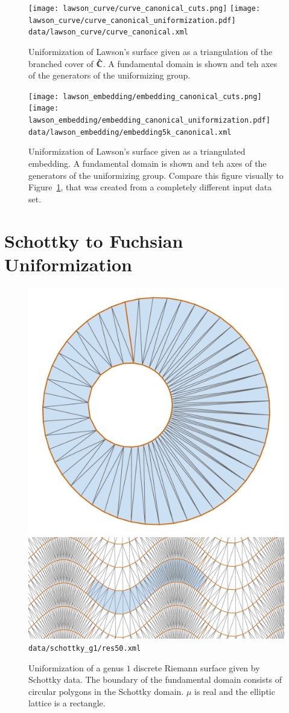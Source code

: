 \documentclass[Thesis.tex]{subfiles}
\begin{document}
\begin{figure}
	\centering
	\texttt{[image: lawson\_curve/curve\_canonical\_cuts.png]}
	\texttt{[image: lawson\_curve/curve\_canonical\_uniformization.pdf]}
	{\scriptsize\tt data/lawson\_curve/curve\_canonical.xml}
	\caption{Uniformization of Lawson's surface given as a triangulation
of the branched cover of $\hat{\mathbb C}$. A fundamental domain is shown and
teh axes of the generators of the uniformizing group.}
	\label{fig:lawson_curve_canonical}
\end{figure}


\begin{figure}
	\centering
	\texttt{[image: lawson\_embedding/embedding\_canonical\_cuts.png]}
	\texttt{[image: lawson\_embedding/embedding\_canonical\_uniformization.pdf]}
	{\scriptsize\tt data/lawson\_embedding/embedding5k\_canonical.xml}
	\caption{Uniformization of Lawson's surface given as a triangulated embedding. A fundamental domain is shown and
teh axes of the generators of the uniformizing group. Compare this figure visually to Figure~\ref{fig:lawson_curve_canonical}, that was created from a 
completely different input data set.}
	\label{fig:lawson_embedding_canonical}
\end{figure}

\section{Schottky to Fuchsian Uniformization}
\label{sec:schottky_examples}

\begin{figure}
	\centering
	\includegraphics[width=0.28\linewidth]{data/schottky_g1/res50_image}
	\quad
	\includegraphics[width=0.68\linewidth]{data/schottky_g1/res50_cover}
	{\scriptsize\tt data/schottky\_g1/res50.xml}
	\caption{Uniformization of a genus $1$ discrete Riemann surface given by Schottky data.
	The boundary of the fundamental domain consists of circular polygons in the Schottky domain. $\mu$ is real and the elliptic lattice is a rectangle.}
	\label{fig:fuchsian_to_schottky_genus1}
\end{figure}
\end{document}
